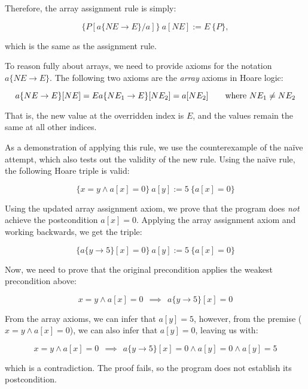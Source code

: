 Therefore, the array assignment rule is simply:

\begin{displaymath}
  \{P[a\{NE \rightarrow E\}/a]\}~a[NE] := E~ \{P\},
\end{displaymath}

which is the same as the assignment rule.

To reason fully about arrays, we need to provide axioms for the notation $a\{NE \rightarrow E\}$. The following two axioms are the \emph{array} axioms in Hoare logic:

\begin{displaymath}
 a\{NE \rightarrow E\}[NE] = E\\
 a\{NE_1 \rightarrow E\}[NE_2] = a[NE_2] ~~~~~~\textrm{where}~ NE_1 \neq NE_2
\end{displaymath}

That is, the new value at the overridden index is $E$, and the values remain the same at all other indices.

\begin{example}
As a demonstration of applying this rule, we use the counterexample of the na\"ive attempt, which also tests out the validity of the new rule. Using the na\"ive rule, the following Hoare triple is valid:

\begin{displaymath}
  \{ x = y \land a[x] = 0\}  ~a[y] := 5~ \{ a[x] = 0\}
\end{displaymath}

Using the updated array assignment axiom, we prove that the program does \emph{not} achieve the postcondition $a[x] = 0$. Applying the array assignment axiom and working backwards, we get the triple:

\begin{displaymath}
 \{ a\{y \rightarrow 5\}[x] = 0\} ~a[y] := 5~ \{ a[x] = 0\}   
\end{displaymath}

Now, we need to prove that the original precondition applies the weakest precondition above:

\begin{displaymath}
 x=y \land a[x] = 0 ~~\implies~~  a\{y \rightarrow 5\}[x] = 0
\end{displaymath}

From the array axioms, we can infer that $a[y] = 5$, however, from the premise ($x=y \land a[x]=0$), we can also infer that $a[y] = 0$, leaving us with:

\begin{displaymath}
 x=y \land a[x] = 0 ~~\implies~~  a\{y \rightarrow 5\}[x] = 0 \land a[y] = 0 \land a[y] = 5
\end{displaymath}

which is a contradiction. The proof fails, so the program does not establish its postcondition.

\end{example}

